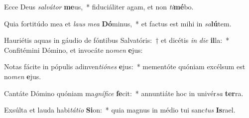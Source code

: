 \item Ecce Deus \textit{sal}\textit{vá}\textit{tor} \textbf{me}us,~* fiduciáliter agam, et non \textit{ti}\textbf{mé}bo.
\item Quia fortitúdo mea et \textit{laus} \textit{me}\textit{a} \textbf{Dó}minus,~* et factus est mihi in \textit{sa}\textbf{lú}tem.
\item Hauriétis aquas in gáudio de fóntibus Salvatóris:~† et dicétis \textit{in} \textit{di}\textit{e} \textbf{il}la:~* Confitémini Dómino, et invocáte no\textit{men} \textbf{e}jus:
\item Notas fácite in pópulis adinven\textit{ti}\textit{ó}\textit{nes} \textbf{e}jus:~* mementóte quóniam excélsum est no\textit{men} \textbf{e}jus.
\item Cantáte Dómino quóniam ma\textit{gní}\textit{fi}\textit{ce} \textbf{fe}cit:~* annuntiáte hoc in univér\textit{sa} \textbf{ter}ra.
\item Exsúlta et lauda habi\textit{tá}\textit{ti}\textit{o} \textbf{Si}on:~* quia magnus in médio tui sanc\textit{tus} \textbf{Is}rael.
